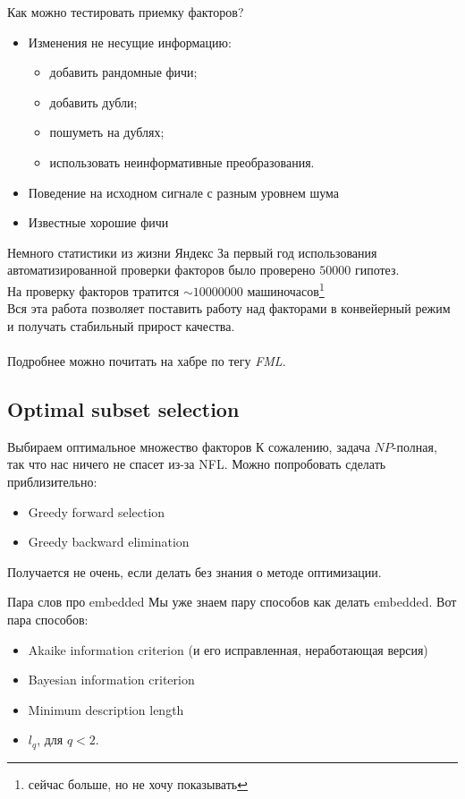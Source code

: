 \documentclass[14pt, fleqn, xcolor={dvipsnames, table}]{beamer}
\begin{document}
\begin{frame}{Как можно тестировать приемку факторов?}
\begin{itemize}
  \item Изменения не несущие информацию:
  \begin{itemize}
    \item добавить рандомные фичи;
    \item добавить дубли;
    \item пошуметь на дублях;
    \item использовать неинформативные преобразования.
  \end{itemize}
  \item Поведение на исходном сигнале с разным уровнем шума
  \item Известные хорошие фичи
\end{itemize}
\end{frame}

\begin{frame}{Немного статистики из жизни {\color{red}Я}ндекс}
За первый год использования автоматизированной проверки факторов было проверено \textbf{$50 000$} гипотез. \\
На проверку факторов тратится \textbf{$\sim10 000 000$} машиночасов\footnote{сейчас больше, но не хочу показывать} \\
Вся эта работа позволяет поставить работу над факторами в конвейерный режим и получать стабильный прирост качества. \\
~\\
Подробнее можно почитать на хабре по тегу \textit{FML}.
\end{frame}

\subsection{Optimal subset selection}
\begin{frame}{Выбираем оптимальное множество факторов}
К сожалению, задача $NP$-полная, так что нас ничего не спасет из-за NFL. Можно попробовать сделать приблизительно:
\begin{itemize}
  \item Greedy forward selection
  \item Greedy backward elimination
\end{itemize}
Получается не очень, если делать без знания о методе оптимизации.
\end{frame}

\begin{frame}{Пара слов про embedded}
Мы уже знаем пару способов как делать embedded. Вот пара способов:
\begin{itemize}
  \item Akaike information criterion (и его исправленная, неработающая версия)
  \item Bayesian information criterion
  \item Minimum description length
  \item $l_q$, для $q < 2$.
\end{itemize}
\end{frame}
\end{document}
